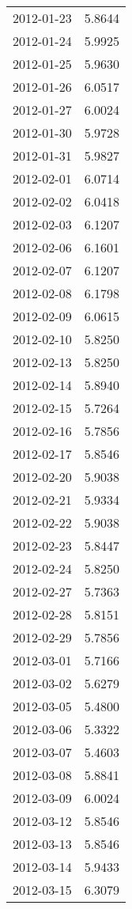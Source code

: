 \begin{tabular}{lr}
2012-01-23 &      5.8644 \\
2012-01-24 &      5.9925 \\
2012-01-25 &      5.9630 \\
2012-01-26 &      6.0517 \\
2012-01-27 &      6.0024 \\
2012-01-30 &      5.9728 \\
2012-01-31 &      5.9827 \\
2012-02-01 &      6.0714 \\
2012-02-02 &      6.0418 \\
2012-02-03 &      6.1207 \\
2012-02-06 &      6.1601 \\
2012-02-07 &      6.1207 \\
2012-02-08 &      6.1798 \\
2012-02-09 &      6.0615 \\
2012-02-10 &      5.8250 \\
2012-02-13 &      5.8250 \\
2012-02-14 &      5.8940 \\
2012-02-15 &      5.7264 \\
2012-02-16 &      5.7856 \\
2012-02-17 &      5.8546 \\
2012-02-20 &      5.9038 \\
2012-02-21 &      5.9334 \\
2012-02-22 &      5.9038 \\
2012-02-23 &      5.8447 \\
2012-02-24 &      5.8250 \\
2012-02-27 &      5.7363 \\
2012-02-28 &      5.8151 \\
2012-02-29 &      5.7856 \\
2012-03-01 &      5.7166 \\
2012-03-02 &      5.6279 \\
2012-03-05 &      5.4800 \\
2012-03-06 &      5.3322 \\
2012-03-07 &      5.4603 \\
2012-03-08 &      5.8841 \\
2012-03-09 &      6.0024 \\
2012-03-12 &      5.8546 \\
2012-03-13 &      5.8546 \\
2012-03-14 &      5.9433 \\
2012-03-15 &      6.3079 \\

\end{tabular}
